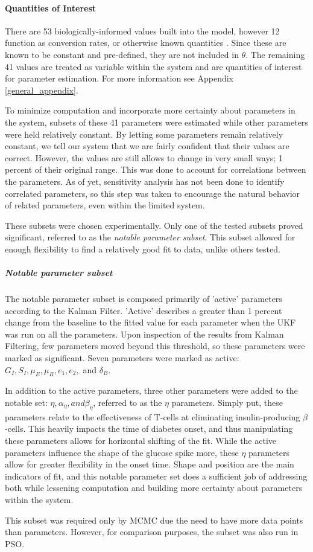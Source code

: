 \paragraph{Quantities of Interest}
There are 53 biologically-informed values built into the model, however 12 function as conversion rates, or otherwise known quantities \cite{shtylla2019mathematical}. Since these are known to be constant and pre-defined, they are not included in $\theta$. The remaining 41 values are treated as variable within the system and are quantities of interest for parameter estimation. For more information see Appendix \ref{general_appendix}.
\par To minimize computation and incorporate more certainty about parameters in the system, subsets of these 41 parameters were estimated while other parameters were held relatively constant. By letting some parameters remain relatively constant, we tell our system that we are fairly confident that their values are correct. However, the values are still allows to change in very small ways; 1 percent of their original range. This was done to account for correlations between the parameters. As of yet, sensitivity analysis has not been done to identify correlated parameters, so this step was taken to encourage the natural behavior of related parameters, even within the limited system.
\par These subsets were chosen experimentally. Only one of the tested subsets proved significant, referred to as the \emph{notable parameter subset}. This subset allowed for enough flexibility to find a relatively good fit to data, unlike others tested.
\subparagraph{Notable parameter subset} \label{section:NotableParameterSubset}
The notable parameter subset is composed primarily of 'active' parameters according to the Kalman Filter. 'Active' describes a greater than 1 percent change from the baseline to the fitted value for each parameter when the UKF was run on all the parameters. Upon inspection of the results from Kalman Filtering, few parameters moved beyond this threshold, so these parameters were marked as significant. Seven parameters were marked as active: $G_{I}, S_{I}, \mu_{E}, \mu_{R}, e_{1}, e_{2},$ and $\delta_{B}$.
\par In addition to the active parameters, three other parameters were added to the notable set: $\eta, \alpha_{\eta}, and \beta_{\eta}$, referred to as the $\eta$ parameters. Simply put, these parameters relate to the effectiveness of T-cells at eliminating insulin-producing $\beta$-cells. This heavily impacts the time of diabetes onset, and thus manipulating these parameters allows for horizontal shifting of the fit. While the active parameters influence the shape of the glucose spike more, these $\eta$ parameters allow for greater flexibility in the onset time. Shape and position are the main indicators of fit, and this notable parameter set does a sufficient job of addressing both while lessening computation and building more certainty about parameters within the system. 
\par This subset was required only by MCMC due the need to have more data points than parameters. However, for comparison purposes, the subset was also run in PSO. 

